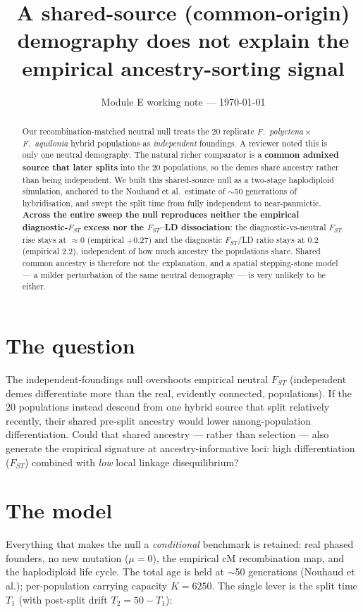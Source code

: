 \documentclass[11pt,a4paper]{article}
\title{A shared-source (common-origin) demography does not explain the
empirical ancestry-sorting signal}
\author{}
\date{Module E working note --- \today}
\begin{document}
\maketitle
\vspace{-2em}

\begin{abstract}\noindent
Our recombination-matched neutral null treats the 20 replicate
\textit{F.\ polyctena}\,$\times$\,\textit{F.\ aquilonia} hybrid populations as
\emph{independent} foundings. A reviewer noted this is only one neutral demography.
The natural richer comparator is a \textbf{common admixed source that later splits}
into the 20 populations, so the demes share ancestry rather than being independent.
We built this shared-source null as a two-stage haplodiploid simulation, anchored to
the Nouhaud et al.\ estimate of $\sim$50 generations of hybridisation, and swept the
split time from fully independent to near-panmictic. \textbf{Across the entire sweep
the null reproduces neither the empirical diagnostic-$F_{ST}$ excess nor the
$F_{ST}$--LD dissociation}: the diagnostic-vs-neutral $F_{ST}$ rise stays at
$\approx 0$ (empirical $+0.27$) and the diagnostic $F_{ST}$/LD ratio stays at $0.2$
(empirical $2.2$), independent of how much ancestry the populations share. Shared
common ancestry is therefore not the explanation, and a spatial stepping-stone model
--- a milder perturbation of the same neutral demography --- is very unlikely to be
either.
\end{abstract}

\section*{The question}
The independent-foundings null overshoots empirical neutral $F_{ST}$ (independent
demes differentiate more than the real, evidently connected, populations). If the 20
populations instead descend from one hybrid source that split relatively recently,
their shared pre-split ancestry would lower among-population differentiation. Could
that shared ancestry --- rather than selection --- also generate the empirical
signature at ancestry-informative loci: high differentiation ($F_{ST}$) combined with
\emph{low} local linkage disequilibrium?

\section*{The model}
Everything that makes the null a \emph{conditional} benchmark is retained: real phased
founders, no new mutation ($\mu=0$), the empirical cM recombination map, and the
haplodiploid life cycle. The total age is held at $\sim$50 generations (Nouhaud et
al.); per-population carrying capacity $K=6250$. The single lever is the split time
$T_1$ (with post-split drift $T_2 = 50 - T_1$):
\end{document}
